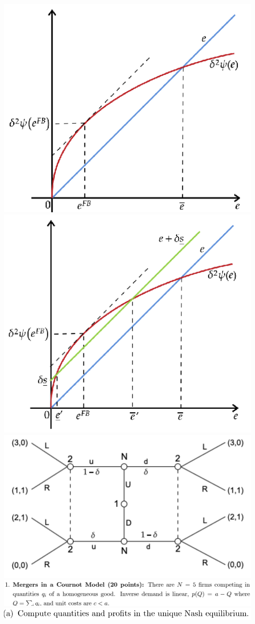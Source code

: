 \documentclass[8pt,landscape]{extarticle}
\begin{document}
\begin{multicols*}{3}
    \includegraphics[width=0.66\linewidth,keepaspectratio]{Screenshots/Screenshot 2024-03-11 133540.png}
    \includegraphics[width=0.67\linewidth,keepaspectratio]{Screenshots/Screenshot 2024-03-11 133547.png}
    \includegraphics[width=0.54\linewidth,keepaspectratio]{Screenshots/Screenshot 2024-03-11 133553.png}
    \includegraphics[width=0.77\linewidth,keepaspectratio]{Screenshots/Screenshot 2024-03-11 134421.png}
    \includegraphics[width=0.57\linewidth,keepaspectratio]{Screenshots/Screenshot 2024-03-11 134426.png}

\end{multicols*}
\end{document}
